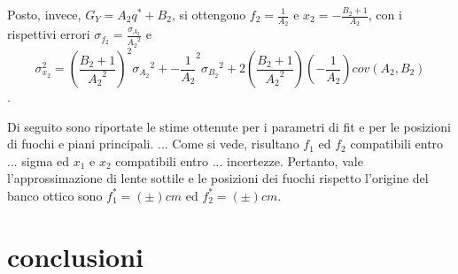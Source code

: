 \documentclass{article}
\begin{document}
	Posto, invece, $G_Y = A_2 q^* + B_2$, si ottengono $f_2 = \frac{1}{A_2}$ e $x_2 = -\frac{B_2 + 1}{A_2}$, con i rispettivi errori $\sigma_{f_2} = \frac{\sigma_{A_2}}{{A_2}^2}$ e $$\sigma_{x_2}^2 = (\frac{B_2+1}{{A_2}^2})^2 {\sigma_{A_2}}^2 +  %
	{-\frac{1}{A_2}}^2{\sigma_{B_2}}^2 +  %
	2 (\frac{B_2+1}{{A_2}^2})(-\frac{1}{A_2})cov(A_2,B_2)$$. %
	
	Di seguito sono riportate le stime ottenute per i parametri di fit e per le posizioni di fuochi e piani principali.
	...
	Come si vede, risultano $f_1$ ed $f_2$ compatibili entro ... sigma ed $x_1$ e $x_2$ compatibili entro ... incertezze. Pertanto, vale l'approssimazione di lente sottile e le posizioni dei fuochi rispetto l'origine del banco ottico sono $f^*_1 = (\pm)cm$ ed $f^*_2 = (\pm)cm$.
			
			
			
	\section{conclusioni}
			
			
			
\end{document}
